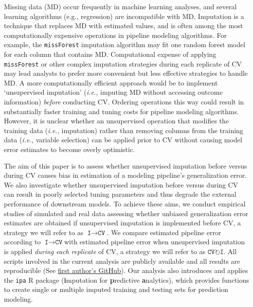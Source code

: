 \documentclass[AMA,STIX1COL,doublespace]{WileyNJD-v2}
\begin{document}
Missing data (MD) occur frequently in machine learning analyses, and
several learning algorithms (e.g., regression) are incompatible with MD.
Imputation is a technique that replaces MD with estimated values, and is
often among the most computationally expensive operations in pipeline
modeling algorithms. For example, the \texttt{missForest} imputation
algorithm may fit one random forest model for each column that contains
MD. Computational expense of applying \texttt{missForest} or other
complex imputation strategies during each replicate of CV may lead
analysts to prefer more convenient but less effective strategies to
handle MD.\citep{stekhoven2011missforest} A more computationally
efficient approach would be to implement `unsupervised imputation'
(\textit{i.e., }imputing MD without accessing outcome information)
\emph{before} conducting CV. Ordering operations this way could result
in substantially faster training and tuning costs for pipeline modeling
algorithms. However, it is unclear whether an unsupervised operation
that modifies the training data (\textit{i.e., }imputation) rather than
removing columns from the training data (\textit{i.e., }variable
selection) can be applied prior to CV without causing model error
estimates to become overly optimistic.

The aim of this paper is to assess whether unsupervised imputation
before versus during CV causes bias in estimation of a modeling
pipeline's generalization error. We also investigate whether
unsupervised imputation before versus during CV can result in poorly
selected tuning parameters and thus degrade the external performance of
downstream models. To achieve these aims, we conduct empirical studies
of simulated and real data assessing whether unbiased generalization
error estimates are obtained if unsupervised imputation is implemented
before CV, a strategy we will refer to as
$\texttt{I}\!\!\rightarrow\!\texttt{CV}$. We compare estimated pipeline
error according to $\texttt{I}\!\!\rightarrow\!\texttt{CV}$\space with
estimated pipeline error when unsupervised imputation is applied
\emph{during each replicate} of CV, a strategy we will refer to as
$\texttt{CV}\!\circlearrowright\!\texttt{I}$. All scripts involved in
the current analysis are publicly available and all results are
reproducible (See
\href{https://github.com/bcjaeger/Imputation-and-CV}{first author's
GitHub}). Our analysis also introduces and applies the \texttt{ipa} R
package (\textbf{i}mputation for \textbf{p}redictive
\textbf{a}nalytics), which provides functions to create single or
multiple imputed training and testing sets for prediction modeling.
\end{document}
